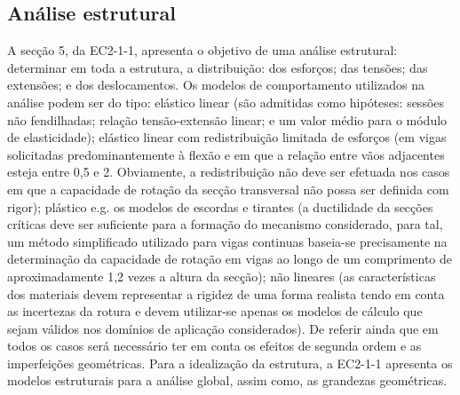 \subsection{Análise estrutural}
A secção 5, da EC2-1-1, apresenta o objetivo de uma análise estrutural: determinar em toda a estrutura, a distribuição: dos esforços; das tensões; das extensões; e dos deslocamentos. Os modelos de comportamento utilizados na análise podem ser do tipo: elástico linear (são admitidas como hipóteses: sessões não fendilhadas; relação tensão-extensão linear; e um valor médio para o módulo de elasticidade); elástico linear com redistribuição limitada de esforços (em vigas solicitadas predominantemente à flexão e em que a relação entre vãos adjacentes esteja entre 0,5 e 2. Obviamente, a redistribuição não deve ser efetuada nos casos em que a capacidade de rotação da secção transversal não possa ser definida com rigor); plástico e.g. os modelos de escordas e tirantes (a ductilidade da secções críticas deve ser suficiente para a formação do mecanismo considerado, para tal, um método simplificado utilizado para vigas continuas baseia-se precisamente na determinação da capacidade de rotação em vigas ao longo de um comprimento de aproximadamente 1,2 vezes a altura da secção); não lineares (as características dos materiais devem representar a rigidez de uma forma realista tendo em conta as incertezas da rotura e devem utilizar-se apenas os modelos de cálculo que sejam válidos nos domínios de aplicação considerados). De referir ainda que em todos os casos será necessário ter em conta os efeitos de segunda ordem e as imperfeições geométricas. Para a idealização da estrutura, a EC2-1-1 apresenta os modelos estruturais para a análise global, assim como, as grandezas geométricas.

